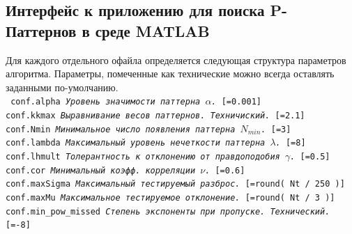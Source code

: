 \documentclass[12pt,fсeqn]{article}
\begin{document}
\subsection{Интерфейс к приложению для поиска P-Паттернов в среде MATLAB}
Для каждого отдельного офайла определяется следующая структура параметров алгоритма. Параметры, помеченные как технические можно всегда 
оставлять заданными по-умолчанию.\\
\texttt{
conf.alpha {\em Уровень значимости паттерна $\alpha$.} [=0.001]\\
conf.kkmax {\em Выравнивание весов паттернов. Техничиский.} [=2.1]     \\
conf.Nmin  {\em Минимальное число появления паттерна $N_{min}$.} [=3]      \\
conf.lambda {\em Максимальный уровень нечеткости паттерна $\lambda$.} [=8]\\
conf.lhmult {\em Толерантность к отклонению от правдоподобия $\gamma$.} [=0.5]\\
conf.cor {\em Минимальный коэфф. корреляции $\nu$.} [=0.6]\\
conf.maxSigma {\em Максимальный тестируемый разброс.} [=round( Nt / 250 )]\\
conf.maxMu {\em Максимальное тестируемое отклонение.} [=round( Nt / 3 )]\\
conf.min\_pow\_missed {\em Степень экспоненты при пропуске. Технический.} [=-8]\\
}
\end{document}

